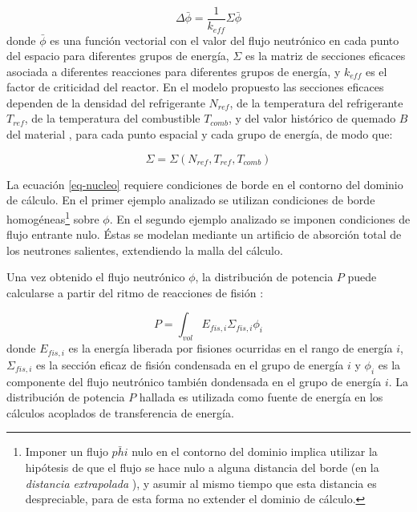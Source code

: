 \begin{equation}
\Delta \bar{\phi} = \frac{1}{k_{eff}}\Sigma \bar{\phi}
\label{eq-nucleo}
\end{equation}
donde $\bar{\phi}$ es una función vectorial con el valor del flujo neutrónico en cada punto del espacio para diferentes grupos de energía,
$\Sigma$ es la matriz de secciones eficaces asociada a diferentes reacciones para diferentes grupos de energía,
y $k_{eff}$ es el factor de criticidad del reactor.
En el modelo propuesto las secciones eficaces dependen de la densidad del refrigerante $N_{ref}$, de la temperatura del refrigerante $T_{ref}$, de la temperatura del combustible $T_{comb}$, 
y del valor histórico de quemado $B$ del material \cite{lamarsh},
para cada punto espacial y cada grupo de energía, de modo que:

\begin{equation}
\Sigma = \Sigma \left ( N_{ref}, T_{ref}, T_{comb} \right )
\label{eq-sigma}
\end{equation}

La ecuación \ref{eq-nucleo} requiere condiciones de borde en el contorno del dominio de cálculo.
En el primer ejemplo analizado se utilizan condiciones de borde homogéneas\footnote{
Imponer un flujo $\bar{phi}$ nulo en el contorno del dominio implica utilizar la hipótesis de que el flujo se hace nulo a alguna distancia del borde (en la \textit{distancia extrapolada} \cite{lamarsh}),
y asumir al mismo tiempo que esta distancia es despreciable, para de esta forma no extender el dominio de cálculo.
} sobre $\phi$.
En el segundo ejemplo analizado se imponen condiciones de flujo entrante nulo.
Éstas se modelan mediante un artificio de absorción total de los neutrones salientes, extendiendo la malla del cálculo.

Una vez obtenido el flujo neutrónico $\phi$,
la distribución de potencia $P$ puede calcularse a partir del ritmo de reacciones de fisión \cite{lamarsh}:

\begin{equation}
P = \int_{vol} E_{fis,i} \Sigma_{fis,i} \phi_{i}
\label{power}
\end{equation}
donde $E_{fis,i}$ es la energía liberada por fisiones ocurridas en el rango de energía $i$,
$\Sigma_{fis,i}$ es la sección eficaz de fisión condensada en el grupo de energía $i$ y
$\phi_{i}$ es la componente del flujo neutrónico también dondensada en el grupo de energía $i$.
La distribución de potencia ${P}$ hallada es utilizada como fuente de energía en los cálculos acoplados de transferencia de energía.

